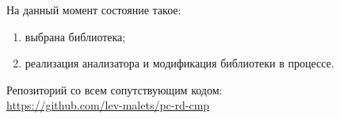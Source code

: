 На данный момент состояние такое:
\begin{enumerate}
    \item выбрана библиотека;
    \item реализация анализатора и модификация библиотеки в процессе.
\end{enumerate}

\noindent
Репозиторий со всем сопутствующим кодом:
\\\quad\url{https://github.com/lev-malets/pc-rd-cmp}
